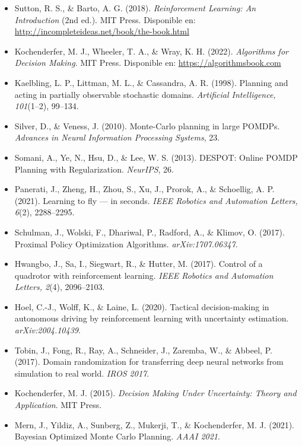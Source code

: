 \documentclass[11pt]{article}
\begin{document}
\begin{itemize}[leftmargin=1.8em]
    \item Sutton, R. S., \& Barto, A. G. (2018). \textit{Reinforcement Learning: An Introduction} (2nd ed.). MIT Press. Disponible en: \url{http://incompleteideas.net/book/the-book.html}

    \item Kochenderfer, M. J., Wheeler, T. A., \& Wray, K. H. (2022). \textit{Algorithms for Decision Making}. MIT Press. Disponible en: \url{https://algorithmsbook.com}

    \item Kaelbling, L. P., Littman, M. L., \& Cassandra, A. R. (1998). Planning and acting in partially observable stochastic domains. \textit{Artificial Intelligence, 101}(1--2), 99--134.

    \item Silver, D., \& Veness, J. (2010). Monte-Carlo planning in large POMDPs. \textit{Advances in Neural Information Processing Systems}, 23.

    \item Somani, A., Ye, N., Hsu, D., \& Lee, W. S. (2013). DESPOT: Online POMDP Planning with Regularization. \textit{NeurIPS}, 26.

    \item Panerati, J., Zheng, H., Zhou, S., Xu, J., Prorok, A., \& Schoellig, A. P. (2021). Learning to fly --- in seconds. \textit{IEEE Robotics and Automation Letters, 6}(2), 2288--2295.

    \item Schulman, J., Wolski, F., Dhariwal, P., Radford, A., \& Klimov, O. (2017). Proximal Policy Optimization Algorithms. \textit{arXiv:1707.06347}.

    \item Hwangbo, J., Sa, I., Siegwart, R., \& Hutter, M. (2017). Control of a quadrotor with reinforcement learning. \textit{IEEE Robotics and Automation Letters, 2}(4), 2096--2103.

    \item Hoel, C.-J., Wolff, K., \& Laine, L. (2020). Tactical decision-making in autonomous driving by reinforcement learning with uncertainty estimation. \textit{arXiv:2004.10439}.

    \item Tobin, J., Fong, R., Ray, A., Schneider, J., Zaremba, W., \& Abbeel, P. (2017). Domain randomization for transferring deep neural networks from simulation to real world. \textit{IROS 2017}.

    \item Kochenderfer, M. J. (2015). \textit{Decision Making Under Uncertainty: Theory and Application}. MIT Press.

    \item Mern, J., Yildiz, A., Sunberg, Z., Mukerji, T., \& Kochenderfer, M. J. (2021). Bayesian Optimized Monte Carlo Planning. \textit{AAAI 2021}.
\end{itemize}
\end{document}
